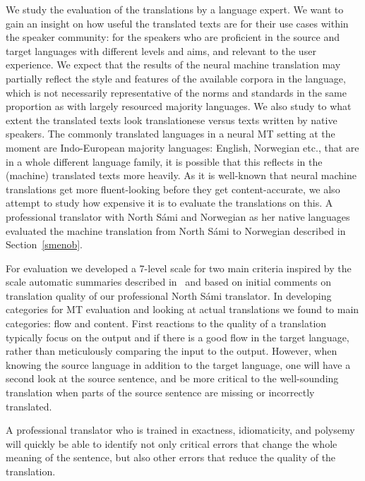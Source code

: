 \documentclass{flammie}
\begin{document}
We study the evaluation of the translations by a language expert.  We want to
gain an insight on how useful the translated texts are for their use cases
within the speaker community: for the speakers who are proficient in the source
and target languages with different levels and aims, and relevant to the user
experience.  We expect that the results of the neural machine translation may
partially reflect the style and features of the available corpora in the
language, which is not necessarily representative of the norms and standards in
the same proportion as with largely resourced majority languages.  We also study
to what extent the translated texts look translationese versus texts written by
native speakers.  The commonly translated languages in a neural MT setting at
the moment are Indo-European majority languages: English, Norwegian etc., that
are in a whole different language family,  it is possible that this reflects in
the (machine) translated texts more heavily.  As it is well-known that neural
machine translations get more fluent-looking before they get content-accurate,
we also attempt to study how expensive it is to evaluate the translations on
this.  A professional translator with North Sámi and Norwegian as her native
languages evaluated the machine translation from North Sámi to Norwegian
described in Section~\ref{smenob}.

For evaluation we developed a 7-level scale for two main criteria inspired by
the scale automatic summaries described in~\cite[p.23]{stiennon2020learning}
and based on initial comments on translation quality of our professional North
Sámi translator.  In developing categories for MT evaluation and looking at
actual translations we found to main categories: flow and content.  First
reactions to the quality of a translation typically focus on the output and if
there is a good flow in the target language, rather than meticulously comparing
the input to the output.  However, when knowing the source language in addition
to the target language, one will have a second look at the source sentence, and
be more critical to the well-sounding translation when parts of the source
sentence are missing or incorrectly translated.

A professional translator who is trained in exactness, idiomaticity, and
polysemy will quickly be able to identify not only critical errors that change
the whole meaning of the sentence, but also other errors that reduce the quality
of the translation.
\end{document}
